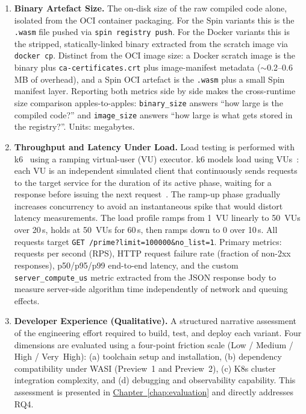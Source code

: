\begin{enumerate}
    \item \begin{sloppypar}\textbf{Binary Artefact Size.} The on-disk size of the raw compiled code alone, isolated from the \acs{OCI} container packaging. For the Spin variants this is the \texttt{.wasm} file pushed via \texttt{spin~registry~push}. For the Docker variants this is the stripped, statically-linked binary extracted from the scratch image via \texttt{docker~cp}. Distinct from the \acs{OCI} image size: a Docker scratch image is the binary plus \texttt{ca-certificates.crt} plus image-manifest metadata ($\sim$0.2--0.6\,\acs{MB} of overhead), and a Spin \acs{OCI} artefact is the \texttt{.wasm} plus a small Spin manifest layer. Reporting both metrics side by side makes the cross-runtime size comparison apples-to-apples: \texttt{binary\_size} answers ``how large is the compiled code?'' and \texttt{image\_size} answers ``how large is what gets stored in the registry?''. Units: megabytes.\end{sloppypar}

    \item \begin{sloppypar}\textbf{Throughput and Latency Under Load.} Load testing is performed with k6~\cite{k6io2024grafana} using a ramping virtual-user (\acs{VU}) executor. k6 models load using \acp{VU}~\cite{k6io2024grafana}: each \acs{VU} is an independent simulated client that continuously sends requests to the target service for the duration of its active phase, waiting for a response before issuing the next request~\cite{k6io2024grafana}. The ramp-up phase gradually increases concurrency to avoid an instantaneous spike that would distort latency measurements. The load profile ramps from 1~\acs{VU} linearly to 50~\acp{VU} over 20\,s, holds at 50~\acp{VU} for 60\,s, then ramps down to 0 over 10\,s. All requests target \texttt{GET /prime?limit=100000\&no\_list=1}. Primary metrics: requests per second (\acs{RPS}), \acs{HTTP} request failure rate (fraction of non-2xx responses), p50/p95/p99 end-to-end latency, and the custom \texttt{server\_compute\_us} metric extracted from the \acs{JSON} response body to measure server-side algorithm time independently of network and queuing effects.\end{sloppypar}

    \item \textbf{Developer Experience (Qualitative).} A structured narrative assessment of the engineering effort required to build, test, and deploy each variant. Four dimensions are evaluated using a four-point friction scale (Low / Medium / High / Very~High): (a) toolchain setup and installation, (b) dependency compatibility under \acs{WASI} (Preview~1 and Preview~2), (c) \acs{K8s} cluster integration complexity, and (d) debugging and observability capability. This assessment is presented in \hyperref[chap:evaluation]{Chapter~\ref{chap:evaluation}} and directly addresses \acs{RQ4}.
\end{enumerate}
